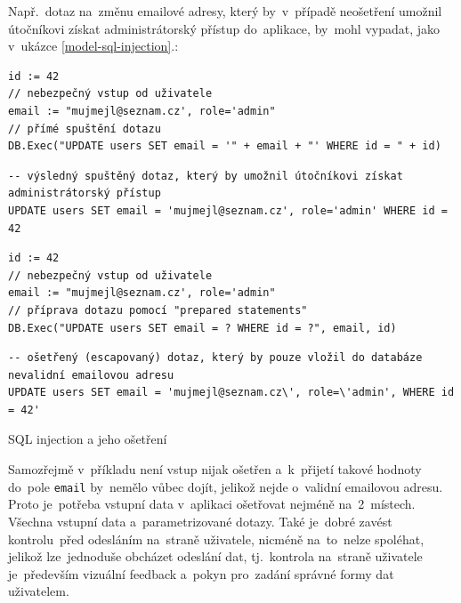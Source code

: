 \documentclass[11pt,a4paper]{report}
\begin{document}
                Např.~dotaz na~změnu emailové adresy, který by~v~případě neošetření umožnil útočníkovi získat administrátorský přístup do~aplikace, by~mohl vypadat, jako v~ukázce \ref{model-sql-injection}.:
                \begin{code}
                    \centering
                    \begin{minipage}{0.48\textwidth}
                        \begin{verbatim}
id := 42
// nebezpečný vstup od uživatele
email := "mujmejl@seznam.cz', role='admin"
// přímé spuštění dotazu
DB.Exec("UPDATE users SET email = '" + email + "' WHERE id = " + id)
                        \end{verbatim}
                        \begin{verbatim}
-- výsledný spuštěný dotaz, který by umožnil útočníkovi získat administrátorský přístup
UPDATE users SET email = 'mujmejl@seznam.cz', role='admin' WHERE id = 42
                        \end{verbatim}
                    \end{minipage}
                    \begin{minipage}{0.48\textwidth}
                        \begin{verbatim}
id := 42
// nebezpečný vstup od uživatele
email := "mujmejl@seznam.cz', role='admin"
// příprava dotazu pomocí "prepared statements"
DB.Exec("UPDATE users SET email = ? WHERE id = ?", email, id)
                        \end{verbatim}
                        \begin{verbatim}
-- ošetřený (escapovaný) dotaz, který by pouze vložil do databáze nevalidní emailovou adresu
UPDATE users SET email = 'mujmejl@seznam.cz\', role=\'admin', WHERE id = 42'
                        \end{verbatim}
                    \end{minipage}
                    \caption{SQL injection a jeho ošetření}
                    \label{model-sql-injection}
                \end{code}

                Samozřejmě v~příkladu není vstup nijak ošetřen a~k~přijetí takové hodnoty do~pole \texttt{email} by~nemělo vůbec dojít, jelikož nejde o~validní emailovou adresu. Proto je~potřeba vstupní data v~aplikaci ošetřovat nejméně na~2~místech. Všechna vstupní data a~parametrizované dotazy. Také je~dobré zavést kontrolu~před odesláním na~straně uživatele, nicméně na~to~nelze spoléhat, jelikož lze~jednoduše obcházet odeslání dat, tj.~kontrola na~straně uživatele je~především vizuální feedback a~pokyn pro~zadání správné formy dat uživatelem.
                
\end{document}

